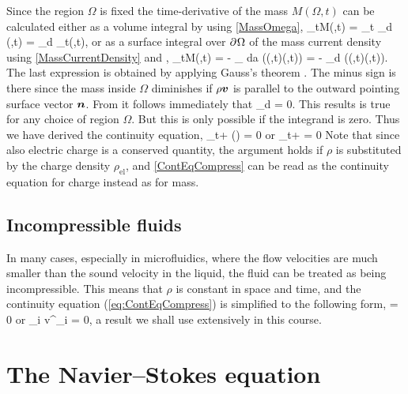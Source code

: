 Since the region $\Omega$ is fixed the time-derivative of the mass
$M(\Omega,t)$ can be calculated either as a volume integral by
using \eqref{MassOmega},
%
 \pp_tM(\Omega,t) =
 \pp_t \int_\Omega d\rrr\: \rho(\rrr,t) =
 \int_\Omega d\rrr\: \pp_t\rho(\rrr,t),
 \eeq
%
or as a surface integral over $\partial^{{}} \Omega$ of the mass current
density using \eqref{MassCurrentDensity} and ,
%
 \pp_tM(\Omega,t) =
 - \int_{\pp\Omega} da\: \nnn\scap\Big(\rho(\rrr,t)\vvv(\rrr,t)\Big) =
 - \int_\Omega d\rrr\: \nabla\scap\Big(\rho(\rrr,t)\vvv(\rrr,t)\Big).
 \eeq
%
The last expression is obtained by applying Gauss's theorem
. The minus sign is there since the mass
inside $\Omega$ diminishes if $\rho\bm{v}$ is parallel to the
outward pointing surface vector $\bm{n}$. From
 it follows immediately that
%
 \int_\Omega d\rrr\:  = 0.
 \eeq
%
This results is true for any choice of region $\Omega$. But this
is only possible if the integrand is zero. Thus we have derived
the continuity equation,
%
 \pp_t\rho + \nabla\scap\big(\rho \vvv \big) = 0
 \quad \textrm{or} \quad
 \pp_t\rho + \nabla\scap\JJJ = 0
 \eeq
%
Note that since also electric charge is a conserved quantity, the
argument holds if $\rho$ is substituted by the charge density
$\rho^{{}}_\textrm{el}$, and \eqref{ContEqCompress} can be read as
the continuity equation for charge instead as for mass.

\subsection{Incompressible fluids}

In many cases, especially in microfluidics, where the flow
velocities are much smaller than the sound velocity in the liquid,
the fluid can be treated as being incompressible. This means that
$\rho$ is constant in space and time, and the continuity equation
(\ref{eq:ContEqCompress}) is simplified to the following form,
%
 \nabla\scap\vvv  = 0
 \quad \textrm{or} \quad
 \pp_i v^{{}}_i = 0,
 \eeq
%
a result we shall use extensively in this course.


\section{The Navier--Stokes equation}

